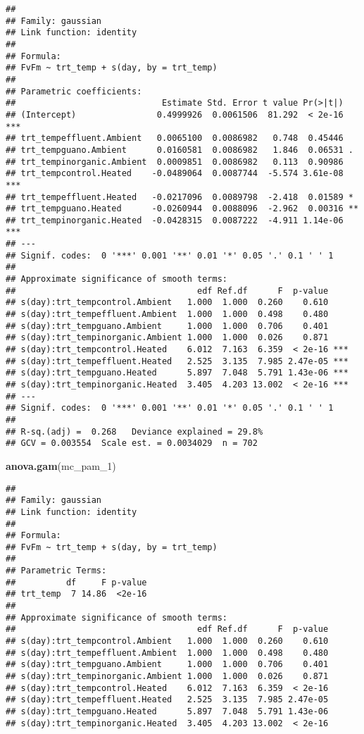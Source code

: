 \documentclass[
]{article}
\newenvironment{Shaded}{\begin{snugshade}}{\end{snugshade}}
\newcommand{\FunctionTok}[1]{\textcolor[rgb]{0.13,0.29,0.53}{\textbf{#1}}}
\newcommand{\NormalTok}[1]{#1}
\begin{document}
\begin{verbatim}
## 
## Family: gaussian 
## Link function: identity 
## 
## Formula:
## FvFm ~ trt_temp + s(day, by = trt_temp)
## 
## Parametric coefficients:
##                             Estimate Std. Error t value Pr(>|t|)    
## (Intercept)                0.4999926  0.0061506  81.292  < 2e-16 ***
## trt_tempeffluent.Ambient   0.0065100  0.0086982   0.748  0.45446    
## trt_tempguano.Ambient      0.0160581  0.0086982   1.846  0.06531 .  
## trt_tempinorganic.Ambient  0.0009851  0.0086982   0.113  0.90986    
## trt_tempcontrol.Heated    -0.0489064  0.0087744  -5.574 3.61e-08 ***
## trt_tempeffluent.Heated   -0.0217096  0.0089798  -2.418  0.01589 *  
## trt_tempguano.Heated      -0.0260944  0.0088096  -2.962  0.00316 ** 
## trt_tempinorganic.Heated  -0.0428315  0.0087222  -4.911 1.14e-06 ***
## ---
## Signif. codes:  0 '***' 0.001 '**' 0.01 '*' 0.05 '.' 0.1 ' ' 1
## 
## Approximate significance of smooth terms:
##                                    edf Ref.df      F  p-value    
## s(day):trt_tempcontrol.Ambient   1.000  1.000  0.260    0.610    
## s(day):trt_tempeffluent.Ambient  1.000  1.000  0.498    0.480    
## s(day):trt_tempguano.Ambient     1.000  1.000  0.706    0.401    
## s(day):trt_tempinorganic.Ambient 1.000  1.000  0.026    0.871    
## s(day):trt_tempcontrol.Heated    6.012  7.163  6.359  < 2e-16 ***
## s(day):trt_tempeffluent.Heated   2.525  3.135  7.985 2.47e-05 ***
## s(day):trt_tempguano.Heated      5.897  7.048  5.791 1.43e-06 ***
## s(day):trt_tempinorganic.Heated  3.405  4.203 13.002  < 2e-16 ***
## ---
## Signif. codes:  0 '***' 0.001 '**' 0.01 '*' 0.05 '.' 0.1 ' ' 1
## 
## R-sq.(adj) =  0.268   Deviance explained = 29.8%
## GCV = 0.003554  Scale est. = 0.0034029  n = 702
\end{verbatim}

\begin{Shaded}
\begin{Highlighting}[]
\FunctionTok{anova.gam}\NormalTok{(mc\_pam\_1)}
\end{Highlighting}
\end{Shaded}

\begin{verbatim}
## 
## Family: gaussian 
## Link function: identity 
## 
## Formula:
## FvFm ~ trt_temp + s(day, by = trt_temp)
## 
## Parametric Terms:
##          df     F p-value
## trt_temp  7 14.86  <2e-16
## 
## Approximate significance of smooth terms:
##                                    edf Ref.df      F  p-value
## s(day):trt_tempcontrol.Ambient   1.000  1.000  0.260    0.610
## s(day):trt_tempeffluent.Ambient  1.000  1.000  0.498    0.480
## s(day):trt_tempguano.Ambient     1.000  1.000  0.706    0.401
## s(day):trt_tempinorganic.Ambient 1.000  1.000  0.026    0.871
## s(day):trt_tempcontrol.Heated    6.012  7.163  6.359  < 2e-16
## s(day):trt_tempeffluent.Heated   2.525  3.135  7.985 2.47e-05
## s(day):trt_tempguano.Heated      5.897  7.048  5.791 1.43e-06
## s(day):trt_tempinorganic.Heated  3.405  4.203 13.002  < 2e-16
\end{verbatim}
\end{document}
